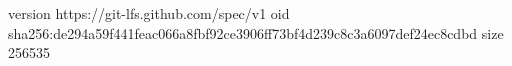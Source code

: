 version https://git-lfs.github.com/spec/v1
oid sha256:de294a59f441feac066a8fbf92ce3906ff73bf4d239c8c3a6097def24ec8cdbd
size 256535
